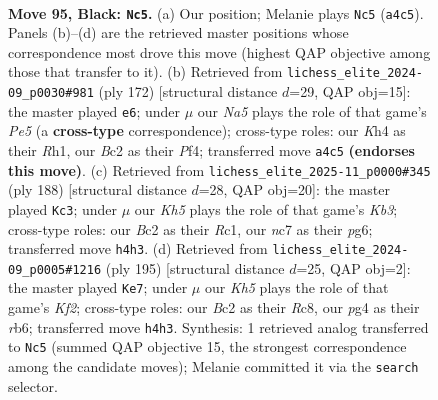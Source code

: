 \documentclass[11pt]{article}
\begin{document}
\clearpage

\begin{figure}[p]\centering
\begin{subfigure}{0.46\textwidth}\centering
\resizebox{\linewidth}{!}{%
\newchessgame
\chessboard[
  setfen={8/2N2PR1/8/8/npB3Pk/8/2b2K2/8 b - - 0 95},
  showmover=false,
  pgfstyle=straightmove, color=movearrow, markmove={a4-c5}
]}
\caption{}
\end{subfigure}\hfill
\begin{subfigure}{0.46\textwidth}\centering
\resizebox{\linewidth}{!}{%
\newchessgame
\chessboard[
  setfen={8/p4K2/7k/4P2p/5P2/8/6rp/7R w - - 10 87},
  showmover=false,
  pgfstyle=straightmove, color=movearrow, markmove={e5-e6}
]}
\caption{}
\end{subfigure}
\\[4pt]
\begin{subfigure}{0.46\textwidth}\centering
\resizebox{\linewidth}{!}{%
\newchessgame
\chessboard[
  setfen={8/8/6pk/8/7p/1K6/p6r/2R5 w - - 0 95},
  showmover=false,
  pgfstyle=straightmove, color=movearrow, markmove={b3-c3}
]}
\caption{}
\end{subfigure}\hfill
\begin{subfigure}{0.46\textwidth}\centering
\resizebox{\linewidth}{!}{%
\newchessgame
\chessboard[
  setfen={2r5/5k2/1R4P1/7p/4BK1P/8/8/8 b - - 0 98},
  showmover=false,
  pgfstyle=straightmove, color=movearrow, markmove={f7-e7}
]}
\caption{}
\end{subfigure}
\caption{\textbf{Move 95, Black: \texttt{Nc5}.} (a) Our position; Melanie plays \texttt{Nc5} (\texttt{a4c5}). Panels (b)--(d) are the retrieved master positions whose correspondence most drove this move (highest QAP objective among those that transfer to it). (b) Retrieved from \texttt{lichess\_elite\_2024-09\_p0030\#981} (ply 172) [structural distance $d$=29, QAP obj=15]: the master played \texttt{e6}; under $\mu$ our \emph{Na5} plays the role of that game's \emph{Pe5} (a \textbf{cross-type} correspondence); cross-type roles: our \emph{K}h4 as their \emph{R}h1, our \emph{B}c2 as their \emph{P}f4; transferred move \texttt{a4c5} \textbf{(endorses this move)}. (c) Retrieved from \texttt{lichess\_elite\_2025-11\_p0000\#345} (ply 188) [structural distance $d$=28, QAP obj=20]: the master played \texttt{Kc3}; under $\mu$ our \emph{Kh5} plays the role of that game's \emph{Kb3}; cross-type roles: our \emph{B}c2 as their \emph{R}c1, our \emph{n}c7 as their \emph{p}g6; transferred move \texttt{h4h3}. (d) Retrieved from \texttt{lichess\_elite\_2024-09\_p0005\#1216} (ply 195) [structural distance $d$=25, QAP obj=2]: the master played \texttt{Ke7}; under $\mu$ our \emph{Kh5} plays the role of that game's \emph{Kf2}; cross-type roles: our \emph{B}c2 as their \emph{R}c8, our \emph{p}g4 as their \emph{r}b6; transferred move \texttt{h4h3}. Synthesis: 1 retrieved analog transferred to \texttt{Nc5} (summed QAP objective 15, the strongest correspondence among the candidate moves); Melanie committed it via the \texttt{search} selector.}
\label{fig:thought-m189}
\end{figure}
\end{document}

